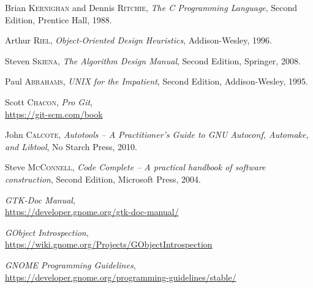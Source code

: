 \begin{thebibliography}{10}

Brian \textsc{Kernighan} and Dennis \textsc{Ritchie},
\emph{The C Programming Language},
Second Edition, Prentice Hall, 1988.

\medskip
{}
Arthur \textsc{Riel},
\emph{Object-Oriented Design Heuristics},
Addison-Wesley, 1996.

\medskip
{}
Steven \textsc{Skiena},
\emph{The Algorithm Design Manual},
Second Edition, Springer, 2008.

\medskip
{}
Paul \textsc{Abrahams},
\emph{UNIX for the Impatient},
Second Edition, Addison-Wesley, 1995.

\medskip
{}
Scott \textsc{Chacon},
\emph{Pro Git},\\
\url{https://git-scm.com/book}

\medskip
{}
John \textsc{Calcote},
\emph{Autotools -- A Practitioner's Guide to GNU Autoconf, Automake, and Libtool},
No Starch Press, 2010.

\medskip
{}
Steve \textsc{McConnell},
\emph{Code Complete -- A practical handbook of software construction},
Second Edition, Microsoft Press, 2004.

\medskip
{}
\emph{GTK-Doc Manual},\\
\url{https://developer.gnome.org/gtk-doc-manual/}

\medskip
{}
\emph{GObject Introspection},\\
\url{https://wiki.gnome.org/Projects/GObjectIntrospection}

\medskip
{}
\emph{GNOME Programming Guidelines},\\
\url{https://developer.gnome.org/programming-guidelines/stable/}

\end{thebibliography}
